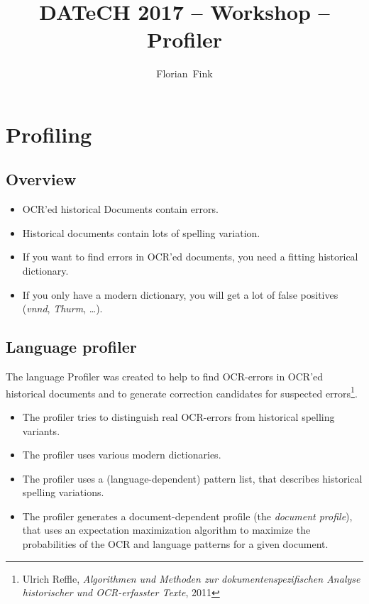 
\title{DATeCH 2017 -- \pocoto{} Workshop -- Profiler}
\author{Florian~Fink}



\begin{frame}
	\titlepage
\end{frame}

\section{Profiling}
\subsection{Overview}
\begin{frame}
	\begin{itemize}
		\item OCR'ed historical Documents contain errors.
		\item Historical documents contain lots of spelling variation.
		\item If you want to find errors in OCR'ed documents, you need a fitting
			historical dictionary.
		\item If you only have a modern dictionary, you will get a lot of false
			positives (\emph{vnnd}, \emph{Thurm}, \dots).
	\end{itemize}
\end{frame}

\subsection{Language profiler}
\begin{frame}
	The language Profiler was created to help to find OCR-errors in OCR'ed
	historical documents and to generate correction candidates for suspected
	errors\footnote{Ulrich Reffle, \emph{Algorithmen und Methoden zur
	dokumentenspezifischen Analyse historischer und OCR-erfasster Texte}, 2011}.

	\begin{itemize}
		\item The profiler tries to distinguish real OCR-errors from historical
			spelling variants.
		\item The profiler uses various modern dictionaries.
		\item The profiler uses a (language-dependent) pattern list, that describes
			historical spelling variations.
		\item The profiler generates a document-dependent profile (the \emph{document
			profile}), that uses an expectation maximization algorithm to maximize the
			probabilities of the OCR and language patterns for a given document.
	\end{itemize}
\end{frame}

